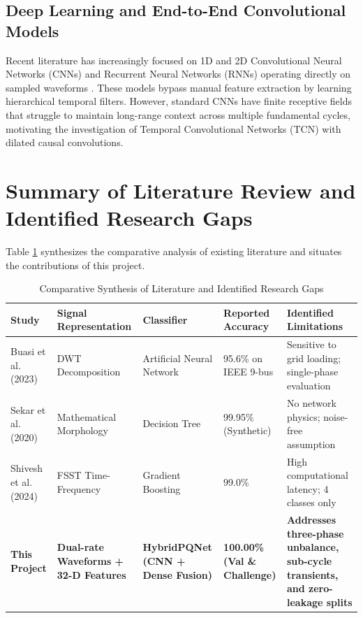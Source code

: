 \documentclass[12pt,a4paper]{report}
\begin{document}
\subsection{Deep Learning and End-to-End Convolutional Models}
Recent literature has increasingly focused on 1D and 2D Convolutional Neural Networks (CNNs) and Recurrent Neural Networks (RNNs) operating directly on sampled waveforms \cite{he2020, bai2021}. These models bypass manual feature extraction by learning hierarchical temporal filters. However, standard CNNs have finite receptive fields that struggle to maintain long-range context across multiple fundamental cycles, motivating the investigation of Temporal Convolutional Networks (TCN) with dilated causal convolutions.

\section{Summary of Literature Review and Identified Research Gaps}
Table \ref{tab:lit_comparison} synthesizes the comparative analysis of existing literature and situates the contributions of this project.

\begin{table}[H]
\centering
\caption{Comparative Synthesis of Literature and Identified Research Gaps}
\label{tab:lit_comparison}
\small
\begin{tabularx}{\textwidth}{lXXXX}
\toprule
\textbf{Study} & \textbf{Signal Representation} & \textbf{Classifier} & \textbf{Reported Accuracy} & \textbf{Identified Limitations} \\
\midrule
Buasi et al. (2023) \cite{buasi2023} & DWT Decomposition & Artificial Neural Network & 95.6\% on IEEE 9-bus & Sensitive to grid loading; single-phase evaluation \\
Sekar et al. (2020) \cite{sekar2020} & Mathematical Morphology & Decision Tree & 99.95\% (Synthetic) & No network physics; noise-free assumption \\
Shivesh et al. (2024) \cite{shivesh2024} & FSST Time-Frequency & Gradient Boosting & 99.0\% & High computational latency; 4 classes only \\
\textbf{This Project} & \textbf{Dual-rate Waveforms + 32-D Features} & \textbf{HybridPQNet (CNN + Dense Fusion)} & \textbf{100.00\% (Val \& Challenge)} & \textbf{Addresses three-phase unbalance, sub-cycle transients, and zero-leakage splits} \\
\bottomrule
\end{tabularx}
\end{table}
\end{document}
